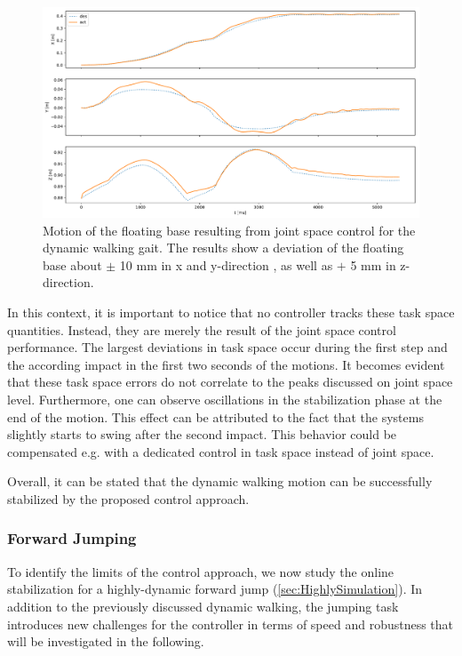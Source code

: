 \begin{figure}[h!]
\centering	
\includegraphics[width=1\textwidth]{fig/walkDynamic/pybullet/pybulletBase}
\caption[Motion of the floating base for dynamic walking]{Motion of the floating base resulting from joint space control for the dynamic walking gait. The results show a deviation of the floating base about $\pm$ 10 mm in x and y-direction , as well as $+$ 5 mm in z-direction.}
\label{fig:walkDynamic_pybulletBase}
\end{figure}

In this context, it is important to notice that no controller tracks these task space quantities. Instead, they are merely the result of the joint space control performance. The largest deviations in task space occur during the first step and the according impact in the first two seconds of the motions. It becomes evident that these task space errors do not correlate to the peaks discussed on joint space level. Furthermore, one can observe oscillations in the stabilization phase at the end of the motion. This effect can be attributed to the fact that the systems slightly starts to swing after the second impact. This behavior could be compensated e.g. with a dedicated control in task space instead of joint space. 

Overall, it can be stated that the dynamic walking motion can be successfully stabilized by the proposed control approach. 

\subsubsection{Forward Jumping}
To identify the limits of the control approach, we now study the online stabilization for a highly-dynamic forward jump (\cref{sec:HighlySimulation}). In addition to the previously discussed dynamic walking, the jumping task introduces new challenges for the controller in terms of speed and robustness that will be investigated in the following.  

